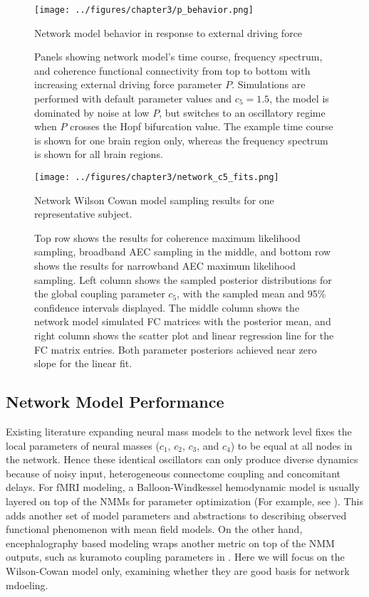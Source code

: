 \begin{figure}[htbp]
    \centering
    \texttt{[image: ../figures/chapter3/p\_behavior.png]}
    \caption{Network model behavior in response to external driving force}
    \caption*{Panels showing network model's time course, frequency spectrum, and coherence functional connectivity from top to bottom with increasing external driving force parameter $P$. Simulations are performed with default parameter values and $c_5 = 1.5$, the model is dominated by noise at low $P$, but switches to an oscillatory regime when $P$ crosses the Hopf bifurcation value. The example time course is shown for one brain region only, whereas the frequency spectrum is shown for all brain regions.}
    \label{fig:p_behavior}
\end{figure}

\begin{figure}[htbp]
	\captionsetup{labelformat=empty}
    \centering
    \texttt{[image: ../figures/chapter3/network\_c5\_fits.png]}
    \caption{}
\end{figure}
\begin{figure}
\captionsetup{justification=centerlast,labelformat=adja-page}
	\ContinuedFloat
    \caption{Network Wilson Cowan model sampling results for one representative subject.}
    \caption*{Top row shows the results for coherence maximum likelihood sampling, broadband AEC sampling in the middle, and bottom row shows the results for narrowband AEC maximum likelihood sampling. Left column shows the sampled posterior distributions for the global coupling parameter $c_5$, with the sampled mean and 95\% confidence intervals displayed. The middle column shows the network model simulated FC matrices with the posterior mean, and right column shows the scatter plot and linear regression line for the FC matrix entries. Both parameter posteriors achieved near zero slope for the linear fit.}
    \label{fig:networkc5}
\end{figure}

\subsection{Network Model Performance}
Existing literature expanding neural mass models to the network level fixes the local parameters of neural masses ($c_1$, $c_2$, $c_3$, and $c_4$) to be equal at all nodes in the network. Hence these identical oscillators can only produce diverse dynamics because of noisy input, heterogeneous connectome coupling and concomitant delays. For fMRI modeling, a Balloon-Windkessel hemodynamic model \cite{buxton_dynamics_1998, friston_nonlinear_2000} is usually layered on top of the NMMs for parameter optimization (For example, see \cite{Zimmermann2018}). This adds another set of model parameters and abstractions to describing observed functional phenomenon with mean field models. On the other hand, encephalography based modeling wraps another metric on top of the NMM outputs, such as kuramoto coupling parameters in \cite{Deco2009}.  Here we will focus on the Wilson-Cowan model only, examining whether they are good basis for network mdoeling.

